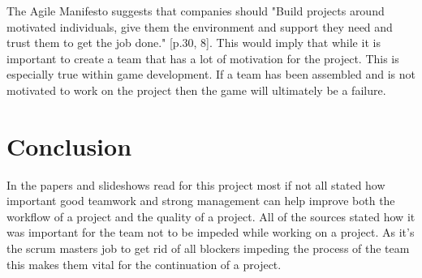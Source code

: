 \documentclass{scrartcl}
\begin{document}
The Agile Manifesto suggests that companies should "Build projects around motivated individuals, give them the environment and support they need and trust them to get the job done." [p.30, 8]. This would imply that while it is important to create a team that has a lot of motivation for the project. This is especially true within game development. If a team has been assembled and is not motivated to work on the project then the game will ultimately be a failure.

\section{Conclusion}

In the papers and slideshows read for this project most if not all stated how important good teamwork and strong management can help improve both the workflow of a project and the quality of a project. All of the sources stated how it was important for the team not to be impeded while working on a project. As it's the scrum masters job to get rid of all blockers impeding the process of the team this makes them vital for the continuation of a project.



\end{document}
